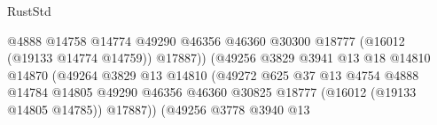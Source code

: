 \begin{lexlean}{RustStd}
\begin{coremodule}
                                                          @4888
                                                          @14758
                                                          @14774
                                                          @49290
                                                          @46356
                                                          @46360
                                                          @30300
                                                          @18777
                                                          (@16012 (@19133 @14774 @14759))
                                                          @17887))
                                                      (@49256
                                                        @3829
                                                        @3941
                                                        @13
                                                        @18
                                                        @14810
                                                        @14870
                                                        (@49264
                                                          @3829
                                                          @13
                                                          @14810
                                                          (@49272
                                                            @625
                                                            @37
                                                            @13
                                                            @4754
                                                            @4888
                                                            @14784
                                                            @14805
                                                            @49290
                                                            @46356
                                                            @46360
                                                            @30825
                                                            @18777
                                                            (@16012 (@19133 @14805 @14785))
                                                            @17887))
                                                        (@49256
                                                          @3778
                                                          @3940
                                                          @13

\end{coremodule}
\end{lexlean}
